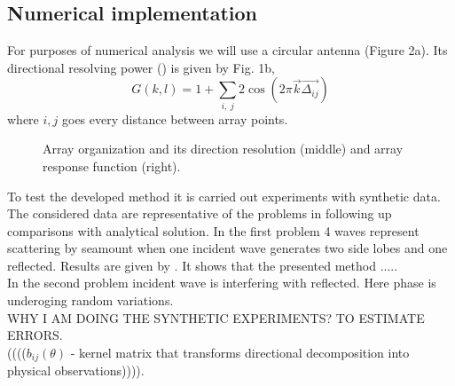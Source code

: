 \subsection{Numerical implementation}
For purposes of numerical analysis we will use a circular antenna (Figure 2a). Its directional resolving power (\cite{barber1963directional}) is given by Fig. 1b,
\begin{equation}
G(k,l) = 1 + \sum_{i,~j} 2\cos(2\pi \vec{k} \vec{\Delta_{ij}})
\end{equation}
where $i,j$ goes every distance between array points.\\
\begin{figure}
\caption{Array organization and its direction resolution (middle) and array response function (right).}
\end{figure}
To test the developed method it is carried out experiments with synthetic data. The considered data are representative of the problems in following up comparisons with analytical solution. In the first problem 4 waves represent scattering by seamount when one incident wave generates two side lobes and one reflected. Results are given by . It shows that the presented method .....\\
In the second problem incident wave is interfering with reflected. Here phase is underoging random variations.\\
WHY I AM DOING THE SYNTHETIC EXPERIMENTS? TO ESTIMATE ERRORS.\\
\small{(((($b_{ij}(\theta)$ - kernel matrix that transforms directional decomposition into physical observations)))).}\\

